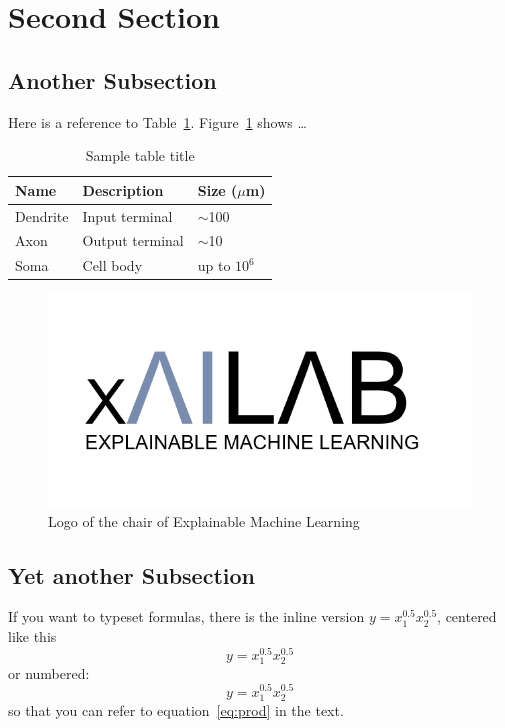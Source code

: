 \documentclass{xai-thesis}
\begin{document}
\section{Second Section}
\label{sec:second}

\subsection{Another Subsection}
\label{subsec:another}
Here is a reference to Table~\ref{t1:sample}. Figure~\ref{fig:xai_logo} shows \ldots


\begin{table}[ht]
	\caption{Sample table title}
	\centering
	\begin{tabular}{lll}
		\hline
		Name     & Description     & Size ($\mu$m) \\
		\hline
		Dendrite & Input terminal  & $\sim$100     \\
		Axon     & Output terminal & $\sim$10      \\
		Soma     & Cell body       & up to $10^6$  \\
		\hline
	\end{tabular}
   \label{t1:sample}
\end{table}


\begin{figure}[ht]
  \centering
   \includegraphics[width=.5\textwidth]{xaiLogo.png}
  \caption{Logo of the chair of Explainable Machine Learning}   
  \label{fig:xai_logo}
\end{figure}  

\subsection{Yet another Subsection}
\label{subsec:yetanother}

If you want to typeset formulas, there is the inline version $ y = x_1^{0.5} x_2^{0.5}$, centered like this
\[
y = x_1^{0.5} x_2^{0.5}
\]
or numbered:
\begin{equation}\label{eq:prod}
y = x_1^{0.5} x_2^{0.5}	
\end{equation}
so that you can refer to equation~\ref{eq:prod} in the text.
\end{document}

